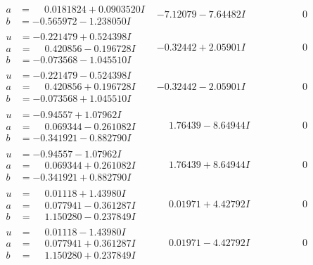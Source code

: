 \documentclass[1p]{elsarticle_modified}
\theoremstyle{definition}
\begin{document}
$$\begin{array}{c|c|c}
\begin{aligned}
a &= \phantom{-}0.0181824 + 0.0903520 I \\
b &= -0.565972 - 1.238050 I\end{aligned}
 & -7.12079 - 7.64482 I & \phantom{-0.000000 } 0 \\ \hline\begin{aligned}
u &= -0.221479 + 0.524398 I \\
a &= \phantom{-}0.420856 - 0.196728 I \\
b &= -0.073568 - 1.045510 I\end{aligned}
 & -0.32442 + 2.05901 I & \phantom{-0.000000 } 0 \\ \hline\begin{aligned}
u &= -0.221479 - 0.524398 I \\
a &= \phantom{-}0.420856 + 0.196728 I \\
b &= -0.073568 + 1.045510 I\end{aligned}
 & -0.32442 - 2.05901 I & \phantom{-0.000000 } 0 \\ \hline\begin{aligned}
u &= -0.94557 + 1.07962 I \\
a &= \phantom{-}0.069344 - 0.261082 I \\
b &= -0.341921 - 0.882790 I\end{aligned}
 & \phantom{-}1.76439 - 8.64944 I & \phantom{-0.000000 } 0 \\ \hline\begin{aligned}
u &= -0.94557 - 1.07962 I \\
a &= \phantom{-}0.069344 + 0.261082 I \\
b &= -0.341921 + 0.882790 I\end{aligned}
 & \phantom{-}1.76439 + 8.64944 I & \phantom{-0.000000 } 0 \\ \hline\begin{aligned}
u &= \phantom{-}0.01118 + 1.43980 I \\
a &= \phantom{-}0.077941 - 0.361287 I \\
b &= \phantom{-}1.150280 - 0.237849 I\end{aligned}
 & \phantom{-}0.01971 + 4.42792 I & \phantom{-0.000000 } 0 \\ \hline\begin{aligned}
u &= \phantom{-}0.01118 - 1.43980 I \\
a &= \phantom{-}0.077941 + 0.361287 I \\
b &= \phantom{-}1.150280 + 0.237849 I\end{aligned}
 & \phantom{-}0.01971 - 4.42792 I & \phantom{-0.000000 } 0\\

\end{array}$$
\end{document}
